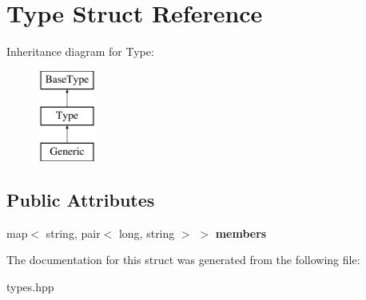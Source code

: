 \hypertarget{structType}{
\section{Type Struct Reference}
\label{structType}
}
Inheritance diagram for Type:\begin{figure}[H]
\begin{center}
\leavevmode
\includegraphics[height=3.000000cm]{structType}
\end{center}
\end{figure}
\subsection*{Public Attributes}
\begin{DoxyCompactItemize}
\item 
\hypertarget{structType_a3e5a92ad7e9ed15e37cbf400a835eea5}{
map$<$ string, pair$<$ long, string $>$ $>$ {\bfseries members}}
\label{structType_a3e5a92ad7e9ed15e37cbf400a835eea5}

\end{DoxyCompactItemize}


The documentation for this struct was generated from the following file:\begin{DoxyCompactItemize}
\item 
types.hpp\end{DoxyCompactItemize}
